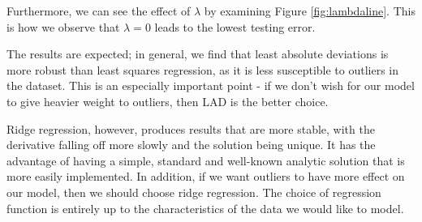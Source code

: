 \documentclass[10pt,letterpaper]{article}
\begin{document}
Furthermore, we can see the effect of $\lambda$ by examining Figure \ref{fig:lambdaline}. This is how we observe that $\lambda=0$ leads to the lowest testing error.

The results are expected; in general, we find that least absolute deviations is more robust than least squares regression, as it is less susceptible to outliers in the dataset. This is an especially important point - if we don't wish for our model to give heavier weight to outliers, then LAD is the better choice.

Ridge regression, however, produces results that are more stable, with the derivative falling off more slowly and the solution being unique. It has the advantage of having a simple, standard and well-known analytic solution that is more easily implemented. In addition, if we want outliers to have more effect on our model, then we should choose ridge regression. The choice of regression function is entirely up to the characteristics of the data we would like to model.
\end{document}

